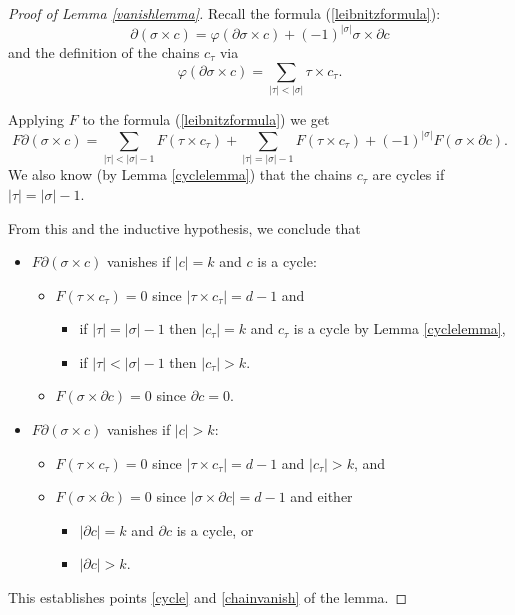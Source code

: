\documentclass[11pt,letterpaper]{amsart}
\begin{document}
\begin{proof}[Proof of Lemma \ref{vanishlemma}]



Recall the formula (\ref{leibnitzformula}): $$
\partial(\sigma\times c)=\varphi(\partial\sigma\times c)+(-1)^{|\sigma|}\sigma\times \partial c
$$ 
and the definition of the chains $c_{\tau}$ via $$\varphi(\partial\sigma\times c)=\sum_{|\tau|<|\sigma|}\tau\times c_{\tau}.
$$


Applying $F$ to the formula (\ref{leibnitzformula}) we get %
$$
F\partial(\sigma\times c)=\sum_{|\tau|<|\sigma|-1}F(\tau\times c_{\tau})+\sum_{|\tau|=|\sigma|-1}F(\tau\times c_{\tau})+(-1)^{|\sigma|}F(\sigma\times\partial c). 
$$
We also know (by Lemma \ref{cyclelemma}) that the chains $c_{\tau}$ are cycles if $|\tau|=|\sigma|-1$. 

From this and the inductive hypothesis, we conclude that \begin{itemize}
\item 
$F\partial(\sigma\times c)$ vanishes if
$|c|=k$ and $c$ is a cycle: 
\begin{itemize}
\item 
$F(\tau\times c_{\tau})=0$ since $|\tau\times c_{\tau}|=d-1$ and 
\begin{itemize}
\item 
if $|\tau|=|\sigma|-1$ then $|c_{\tau}|=k$ and $c_{\tau}$ is a cycle by Lemma \ref{cyclelemma}, 
\item
if $|\tau|<|\sigma|-1$ then $|c_{\tau}|>k$. 
\end{itemize}
\item 
$F(\sigma\times\partial c)=0$ since $\partial c=0$.
\end{itemize}
\item 
$F\partial(\sigma\times c)$ vanishes if
$|c|>k$:
\begin{itemize}
\item 
$F(\tau\times c_{\tau})=0$ since $|\tau\times c_{\tau}|=d-1$ and $|c_{\tau}|>k$, and 
\item 
$F(\sigma\times\partial c)=0$ since $|\sigma\times\partial c|=d-1$ and either 
\begin{itemize}
\item 
$|\partial c|=k$ and $\partial c$ is a cycle, or
\item 
$|\partial c|>k$.
\end{itemize}
\end{itemize}
\end{itemize}
This establishes points \ref{cycle} and \ref{chainvanish} of the lemma. 


\end{proof}
\end{document}
